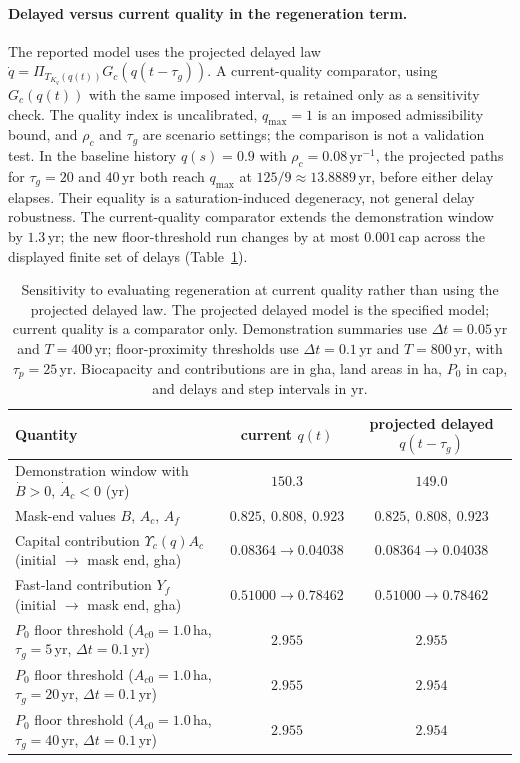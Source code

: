 \documentclass[11pt,a4paper]{article}
\newcommand{\Ups}{\Upsilon_c}
\begin{document}
\paragraph{Delayed versus current quality in the regeneration term.} The reported model uses the projected delayed law $\dot q=\Pi_{T_{K_q}(q(t))}G_c(q(t-\tau_g))$. A current-quality comparator, using $G_c(q(t))$ with the same imposed interval, is retained only as a sensitivity check. The quality index is uncalibrated, $q_{\max}=1$ is an imposed admissibility bound, and $\rho_c$ and $\tau_g$ are scenario settings; the comparison is not a validation test. In the baseline history $q(s)=0.9$ with $\rho_c=0.08$\,yr$^{-1}$, the projected paths for $\tau_g=20$ and $40$\,yr both reach $q_{\max}$ at $125/9\approx13.8889$\,yr, before either delay elapses. Their equality is a saturation-induced degeneracy, not general delay robustness. The current-quality comparator extends the demonstration window by $1.3$\,yr; the new floor-threshold run changes by at most $0.001$\,cap across the displayed finite set of delays (Table~\ref{tab:si_delay}).

\begin{table}[htbp]
\centering\small
\caption{Sensitivity to evaluating regeneration at current quality rather than using the projected delayed law. The projected delayed model is the specified model; current quality is a comparator only. Demonstration summaries use $\Delta t=0.05$\,yr and $T=400$\,yr; floor-proximity thresholds use $\Delta t=0.1$\,yr and $T=800$\,yr, with $\tau_p=25$\,yr. Biocapacity and contributions are in gha, land areas in ha, $P_0$ in cap, and delays and step intervals in yr.}
\label{tab:si_delay}
\begin{tabularx}{\textwidth}{>{\raggedright\arraybackslash}Xcc}
\toprule
Quantity & current $q(t)$ & projected delayed $q(t-\tau_g)$ \\
\midrule
Demonstration window with $\dot B>0$, $\dot A_c<0$ (yr) & $150.3$ & $149.0$ \\
Mask-end values $B$, $A_c$, $A_f$ & $0.825,\ 0.808,\ 0.923$ & $0.825,\ 0.808,\ 0.923$ \\
Capital contribution $\Ups(q)A_c$ (initial $\to$ mask end, gha) & $0.08364\to0.04038$ & $0.08364\to0.04038$ \\
Fast-land contribution $Y_f$ (initial $\to$ mask end, gha) & $0.51000\to0.78462$ & $0.51000\to0.78462$ \\
$P_0$ floor threshold ($A_{c0}=1.0$\,ha, $\tau_g=5$\,yr, $\Delta t=0.1$\,yr) & $2.955$ & $2.955$ \\
$P_0$ floor threshold ($A_{c0}=1.0$\,ha, $\tau_g=20$\,yr, $\Delta t=0.1$\,yr) & $2.955$ & $2.954$ \\
$P_0$ floor threshold ($A_{c0}=1.0$\,ha, $\tau_g=40$\,yr, $\Delta t=0.1$\,yr) & $2.955$ & $2.954$ \\
\bottomrule
\end{tabularx}
\end{table}
\end{document}
